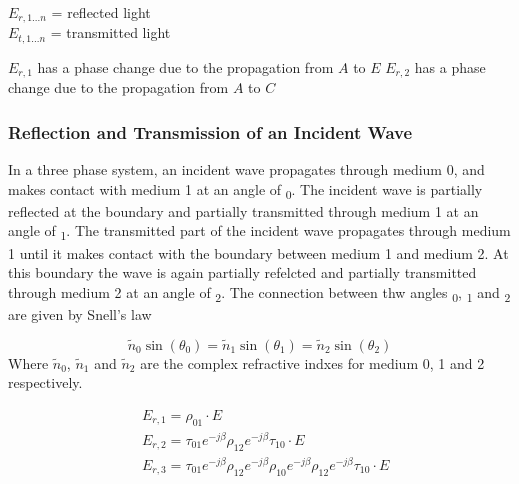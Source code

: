 \documentclass{article}
\begin{document}
$E_{r,1...n}$ = reflected light \\
$E_{t,1...n}$ = transmitted light

$E_{r,1}$ has a phase change due to the propagation from $A$ to $E$ 
$E_{r,2}$ has a phase change due to the propagation from $A$ to $C$ 


\subsubsection*{Reflection and Transmission of an Incident Wave}
In a three phase system, an incident wave propagates through medium 0, 
and makes contact with medium 1 at an angle of \texttheta \textsubscript{0}. The incident wave is 
partially reflected at the boundary and partially transmitted through medium 1
at an angle of \texttheta \textsubscript{1}. The transmitted part of the incident wave
propagates through medium 1 until it makes contact with the boundary between medium 1 and 
medium 2. At this boundary the wave is again partially refelcted and partially transmitted
through medium 2 at an angle of \texttheta \textsubscript{2}. The connection between
thw angles \texttheta \textsubscript{0}, \texttheta \textsubscript{1} and
\texttheta \textsubscript{2} are given by Snell's law

\begin{equation}
    \tilde{n}_0 \sin( \theta_0) = \tilde{n}_1\sin(\theta_1)=\tilde{n}_2\sin(\theta_2)
\end{equation}
Where $\tilde{n}_0$, $\tilde{n}_1$ and $\tilde{n}_2$ are the complex refractive indxes for 
medium 0, 1 and 2 respectively.


\begin{subequations}
    \begin{align}
    & E_{r,1} = \rho_{01} \cdot E \\ 
    & E_{r, 2}=\tau_{01} e^{-j \beta} \rho_{12} e^{-j \beta} \tau_{10} \cdot E \\
    & E_{r, 3}=\tau_{01} e^{-j \beta} \rho_{12} e^{-j \beta} \rho_{10} e^{-j \beta} \rho_{12} e^{-j \beta} \tau_{10} \cdot E
    \end{align}
\end{subequations}



\end{document}
